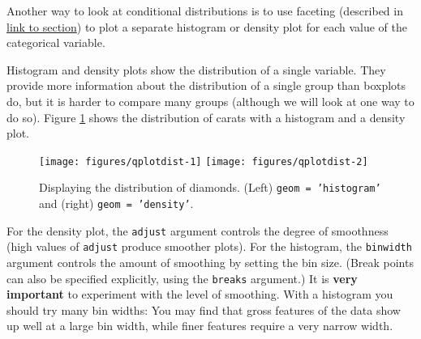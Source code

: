 Another way to look at conditional distributions is to use faceting
(described in \hyperref[sec:qplot-faceting]{link to section}) to plot a
separate histogram or density plot for each value of the categorical
variable.


Histogram and density plots show the distribution of a single variable.
They provide more information about the distribution of a single group
than boxplots do, but it is harder to compare many groups (although we
will look at one way to do so). Figure \ref{fig:dist} shows the
distribution of carats with a histogram and a density plot.
  

\begin{Shaded}
\begin{Highlighting}[]
  \NormalTok{)}
  \NormalTok{)}
\end{Highlighting}
\end{Shaded}

\begin{figure}

{\centering \texttt{[image: figures/qplotdist-1]} \texttt{[image: figures/qplotdist-2]} 

}

\caption{Displaying the distribution of diamonds.  (Left) \texttt{geom = 'histogram'} and (right) \texttt{geom = 'density'}.\label{fig:dist}}
\end{figure}

For the density plot, the \texttt{adjust} argument controls the degree
of smoothness (high values of \texttt{adjust} produce smoother plots).
For the histogram, the \texttt{binwidth} argument controls the amount of
smoothing by setting the bin size. (Break points can also be specified
explicitly, using the \texttt{breaks} argument.) It is \textbf{very
important} to experiment with the level of smoothing. With a histogram
you should try many bin widths: You may find that gross features of the
data show up well at a large bin width, while finer features require a
very narrow width.

